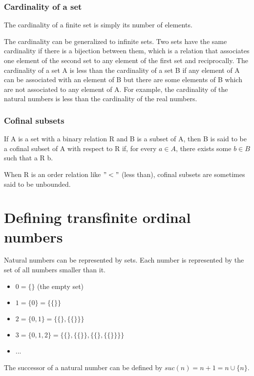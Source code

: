 \documentclass[10pt]{article}
\begin{document}
\subsubsection{Cardinality of a set}

The cardinality of a finite set is simply its number of elements.

The cardinality can be generalized to infinite sets. Two sets have the same cardinality if there is a bijection between them, which is a relation that associates one element of the second set to any element of the first set and reciprocally. The cardinality of a set A is less than the cardinality of a set B if any element of A can be associated with an element of B but there are some elements of B which are not associated to any element of A. For example, the cardinality of the natural numbers is less than the cardinality of the real numbers.

\subsubsection{Cofinal subsets}

If A is a set with a binary relation R and B is a subset of A, then B is said to be a cofinal subset of A with respect to R if, for every \( a \in A \), there exists some \( b \in B \) such that a R b.

When R is an order relation like \( "<" \) (less than), cofinal subsets are sometimes said to be unbounded.

\section{Defining transfinite ordinal numbers}

Natural numbers can be represented by sets. Each number is represented by the set of all numbers smaller than it.
\begin{itemize}
     \setlength{\itemsep}{1pt}
     \setlength{\parskip}{0pt}
     \setlength{\parsep}{0pt}
\item \( 0 = \lbrace\rbrace \) (the empty set)
\item \( 1 = \lbrace 0 \rbrace = \lbrace\lbrace\rbrace\rbrace \)
\item \( 2 = \lbrace 0, 1 \rbrace = \lbrace\lbrace\rbrace,\lbrace\lbrace\rbrace\rbrace\rbrace \)
\item \( 3 = \lbrace 0, 1, 2 \rbrace = \lbrace\lbrace\rbrace,\lbrace\lbrace\rbrace\rbrace,\lbrace\lbrace\rbrace,\lbrace\lbrace\rbrace\rbrace\rbrace\rbrace \)
\item ...
\end{itemize}
The successor of a natural number can be defined by \( suc(n) = n+1 = n \cup \lbrace n \rbrace \).
\end{document}
